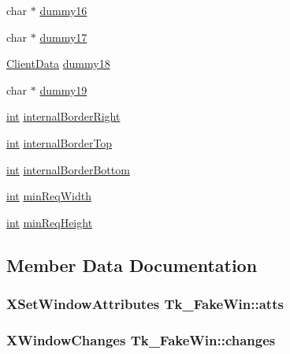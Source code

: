 \begin{DoxyCompactItemize}
\item 
char $\ast$ \hyperlink{struct_tk___fake_win_a0ddceff3435987c46acf401cbde9b2c2}{dummy16}
\item 
char $\ast$ \hyperlink{struct_tk___fake_win_a4fb3f822d877f206a289eaa79c37a9ad}{dummy17}
\item 
\hyperlink{tk_8h_accf84b4d725a8f41e04d6333768a6001}{Client\+Data} \hyperlink{struct_tk___fake_win_a83d21989a0843e863a3affc38269bb64}{dummy18}
\item 
char $\ast$ \hyperlink{struct_tk___fake_win_a840ea16c5cf8dc3a119136a0543c2578}{dummy19}
\item 
\hyperlink{tk_8h_a83f82f76e7fed06f4c49d2db94028a6d}{int} \hyperlink{struct_tk___fake_win_aba3a66d3c94114e75076aa5f2af7fb68}{internal\+Border\+Right}
\item 
\hyperlink{tk_8h_a83f82f76e7fed06f4c49d2db94028a6d}{int} \hyperlink{struct_tk___fake_win_acb57244152049081d43f90398afbee07}{internal\+Border\+Top}
\item 
\hyperlink{tk_8h_a83f82f76e7fed06f4c49d2db94028a6d}{int} \hyperlink{struct_tk___fake_win_a8157d3e278ae2f19a63788f5e08e3fc2}{internal\+Border\+Bottom}
\item 
\hyperlink{tk_8h_a83f82f76e7fed06f4c49d2db94028a6d}{int} \hyperlink{struct_tk___fake_win_a7155d939b5cd9cf75bdf42b9b5c16ab8}{min\+Req\+Width}
\item 
\hyperlink{tk_8h_a83f82f76e7fed06f4c49d2db94028a6d}{int} \hyperlink{struct_tk___fake_win_a9b04053b8ac572102882817392e3b4ba}{min\+Req\+Height}
\end{DoxyCompactItemize}


\subsection{Member Data Documentation}
\subsubsection[{\texorpdfstring{atts}{atts}}]{\setlength{\rightskip}{0pt plus 5cm}X\+Set\+Window\+Attributes Tk\+\_\+\+Fake\+Win\+::atts}\hypertarget{struct_tk___fake_win_a9c99251c375ca65b21f8320ffd732708}{}\label{struct_tk___fake_win_a9c99251c375ca65b21f8320ffd732708}
\subsubsection[{\texorpdfstring{changes}{changes}}]{\setlength{\rightskip}{0pt plus 5cm}X\+Window\+Changes Tk\+\_\+\+Fake\+Win\+::changes}\hypertarget{struct_tk___fake_win_a53191790ced99df24efc09d6744682e4}{}\label{struct_tk___fake_win_a53191790ced99df24efc09d6744682e4}
